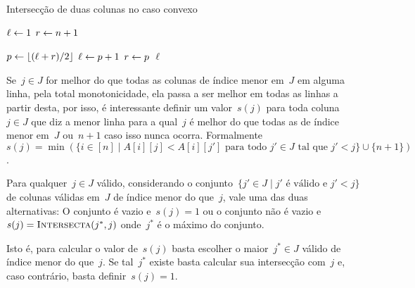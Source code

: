 \begin{algorithm}[h]
\caption{Intersecção de duas colunas no caso convexo}
\label{Online:convex:BB}
\begin{algorithmic}[1]
    \State $\ell \leftarrow 1$
    \State $r \leftarrow n+1$

        \State $p \leftarrow \lfloor(\ell + r)/2\rfloor$
         \label{Online:convex:BB:ineq}
            \State $\ell \leftarrow p + 1$
        \Else
            \State $r \leftarrow p$
        \EndIf
    \EndWhile
    \State \Return $\ell$
\EndFunction
\end{algorithmic}
\end{algorithm}

Se~$j \in J$ for melhor do que todas as colunas de índice menor em~$J$ em alguma linha, pela total monotonicidade, ela passa a ser melhor em todas as linhas a partir desta, por isso, é interessante definir um valor~$s(j)$ para toda coluna~$j \in J$ que diz a menor linha para a qual~$j$ é melhor do que todas as de índice menor em~$J$ ou~$n+1$ caso isso nunca ocorra.  Formalmente~${ s(j) = \min(\{i \in [n] \mid A[i][j] < A[i][j'] \text{ para todo } j' \in J \text{ tal que } j' < j\} \cup \{n+1\}) }$.

\begin{prop} \label{Online:convex:easys}
Para qualquer~$j \in J$ válido, considerando o conjunto~$\{j' \in J \mid j' \text{ é válido e } j' < j\}$ de colunas válidas em~$J$ de índice menor do que~$j$, vale uma das duas alternativas: O conjunto é vazio e~$s(j) = 1$ ou o conjunto não é vazio e~$s(j) = \textsc{Intersecta}(j^*,j)$ onde~$j^*$ é o máximo do conjunto.

Isto é, para calcular o valor de~$s(j)$ basta escolher o maior~$j^* \in J$ válido de índice menor do que~$j$. Se tal~$j^*$ existe basta calcular sua intersecção com~$j$ e, caso contrário, basta definir~$s(j) = 1$.
\end{prop}

